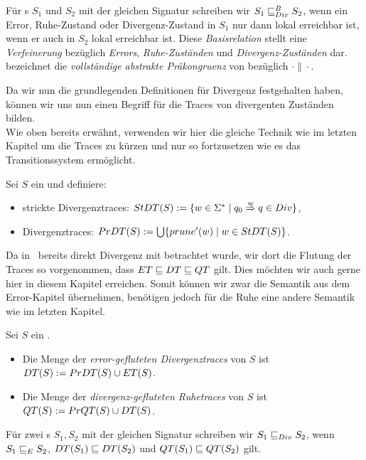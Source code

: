 \begin{Def}
Für \EIO{}s $S_1$ und $S_2$ mit der gleichen Signatur schreiben wir $S_1\sqsubseteq _{Div}^B
S_2$, wenn ein Error, Ruhe-Zustand oder Divergenz-Zustand in $S_1$ nur dann
lokal erreichbar ist, wenn er auch in $S_2$ lokal erreichbar ist. Diese
\emph{Basisrelation} stellt eine \emph{Verfeinerung} bezüglich \emph{Errors},
\emph{Ruhe-Zuständen} und \emph{Divergenz-Zuständen} dar.\\
\DCRel{} bezeichnet die \emph{vollständige abstrakte Präkongruenz} von \DBRel{}
bezüglich $\cdot\|\cdot$.
\end{Def}

Da wir nun die grundlegenden Definitionen für Divergenz festgehalten haben,
können wir uns nun einen Begriff für die Traces von divergenten Zuständen
bilden.\\
Wie oben bereits erwähnt, verwenden wir hier die gleiche Technik wie im letzten
Kapitel um die Traces zu kürzen und nur so fortzusetzen wie es das
Transitionssystem ermöglicht.

\begin{Def}[Divergenztraces]
  Sei $S$ ein \EIO{} und definiere:
  \begin{itemize}
    \item strickte Divergenztraces: $StDT{}(S) := \{w\in\Sigma ^*\mid q_0
      \overset{w}{\Rightarrow} q\in Div\}$,
    \item Divergenztraces: $PrDT{}(S) := \bigcup\{prune' (w)\mid
      w\in StDT{}(S)\}$.
  \end{itemize}
\end{Def}

Da in~\cite{Chilton2013} bereits direkt Divergenz mit betrachtet wurde, wir dort
die Flutung der Traces so vorgenommen, dass $ET\sqsubseteq DT\sqsubseteq QT$
gilt. Dies möchten wir auch gerne hier in diesem Kapitel erreichen. Somit
können wir zwar die Semantik aus dem Error-Kapitel übernehmen, benötigen jedoch
für die Ruhe eine andere Semantik wie im letzten Kapitel.

\begin{Def}
  \label{DefRuheDivSemantik}
  Sei $S$ ein \EIO{}.
  \begin{itemize}
    \item Die Menge der \emph{error-gefluteten Divergenztraces} von $S$ ist
      $DT{}(S) := PrDT{}(S)\cup ET{}(S)$.
    \item Die Menge der \emph{divergenz-gefluteten Ruhetraces} von $S$ ist
      $QT{}(S) := PrQT{}(S)\cup DT{}(S)$.
  \end{itemize}
  Für zwei \EIO{}s $S_1, S_2$ mit der gleichen Signatur schreiben wir $S_1\sqsubseteq _{Div}
  S_2$, wenn $S_1\sqsubseteq _E S_2$, $DT{}(S_1)\sqsubseteq DT{}(S_2)$ und
  $QT{}(S_1)\sqsubseteq QT{}(S_2)$ gilt.
\end{Def}

